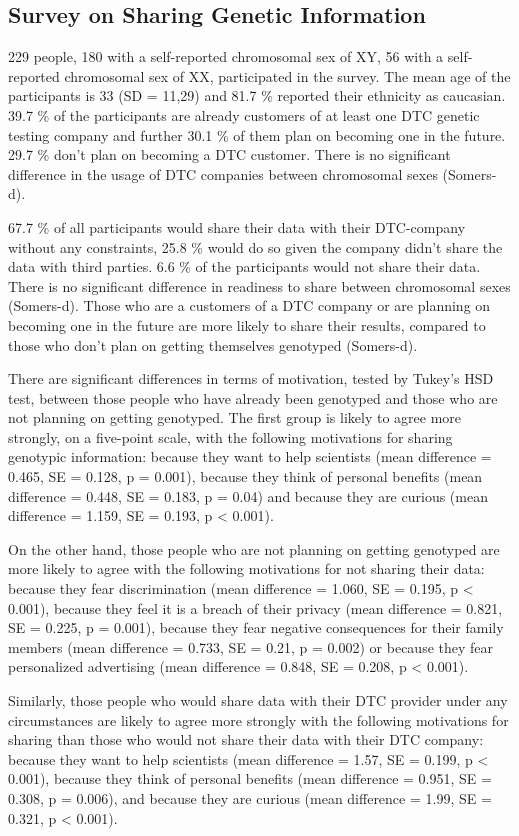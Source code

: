 \documentclass[10pt]{article}
\begin{document}
\subsection*{Survey on Sharing Genetic Information}
229 people, 180 with a self-reported chromosomal sex of XY, 56 with a self-reported chromosomal sex of XX, participated in the survey. The mean age of the participants is 33 (SD = 11,29) and 81.7 \% reported their ethnicity as caucasian. 39.7 \% of the participants are already customers of at least one DTC genetic testing company and further 30.1 \% of them plan on becoming one in the future. 29.7 \% don't plan on becoming a DTC customer. There is no significant difference in the usage of DTC companies between chromosomal sexes (Somers-d). 

67.7 \% of all participants would share their data with their DTC-company without any constraints, 25.8 \% would do so given the company didn't share the data with third parties. 6.6 \% of the participants would not share their data. There is no significant difference in readiness to share between chromosomal sexes (Somers-d). Those who are a customers of a DTC company or are planning on becoming one in the future are more likely to share their results, compared to those who don't plan on getting themselves genotyped (Somers-d). 

There are significant differences in terms of motivation, tested by Tukey's HSD test, between those people who have already been genotyped and those who are not planning on getting genotyped. The first group is likely to agree more strongly, on a five-point scale, with the following motivations for sharing genotypic information: because they want to help scientists (mean difference = 0.465, SE = 0.128, p = 0.001), because they think of personal benefits (mean difference = 0.448, SE = 0.183, p = 0.04) and because they are curious (mean difference = 1.159, SE = 0.193, p < 0.001). 

On the other hand, those people who are not planning on getting genotyped are more likely to agree with the following motivations for not sharing their data: because they fear discrimination (mean difference = 1.060, SE = 0.195, p < 0.001), because they feel it is a breach of their privacy (mean difference = 0.821, SE = 0.225, p = 0.001), because they fear negative consequences for their family members (mean difference = 0.733, SE = 0.21, p = 0.002) or because they fear personalized advertising (mean difference = 0.848, SE = 0.208, p < 0.001).

Similarly, those people who would share data with their DTC provider under any circumstances are likely to agree more strongly with the following motivations for sharing than those who would not share their data with their DTC company: because they want to help scientists (mean difference = 1.57, SE = 0.199, p < 0.001), because they think of personal benefits (mean difference = 0.951, SE = 0.308, p = 0.006), and because they are curious (mean difference = 1.99, SE = 0.321, p < 0.001). 
\end{document}
